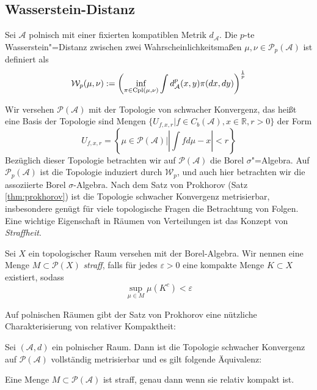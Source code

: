 \subsection{Wasserstein-Distanz}
\begin{definition}\label{def:wasserstein_distance}
    Sei $\mathcal{A}$ polnisch mit einer fixierten kompatiblen Metrik $d_\mathcal{A}$. Die $p$-te Wasserstein"=Distanz zwischen zwei Wahrscheinlichkeitsmaßen $\mu, \nu \in \mathcal{P}_p(\mathcal{A})$ ist definiert als
    $$\mathcal{W}_p(\mu, \nu) := \left( \inf_{\pi \in \operatorname{Cpl}(\mu, \nu)} \int d^p_\mathcal{A}(x, y) \pi(dx, dy) \right)^\frac{1}{p}$$
\end{definition}
Wir versehen $\mathcal{P}(\mathcal{A})$ mit der Topologie von schwacher Konvergenz, das heißt eine Basis der Topologie sind Mengen $\{U_{f, x, r} \vert f \in C_b(\mathcal{A}), x\in \mathbb{R}, r>0\}$ der Form 
$$U_{f, x, r} = \left\{ \mu \in \mathcal{P}(\mathcal{A}) \vert \left| \int f d\mu - x\right| < r\right\}$$
Bezüglich dieser Topologie betrachten wir auf $\mathcal{P}(\mathcal{A})$ die Borel $\sigma$"=Algebra. Auf $\mathcal{P}_p(\mathcal{A})$ ist die Topologie induziert durch $\mathcal{W}_p$, und auch hier betrachten wir die assoziierte Borel $\sigma$-Algebra. Nach dem Satz von Prokhorov (Satz \ref{thm:prokhorov}) ist die Topologie schwacher Konvergenz metrisierbar, insbesondere genügt für viele topologische Fragen die Betrachtung von Folgen. \\

Eine wichtige Eigenschaft in Räumen von Verteilungen ist das Konzept von \emph{Straffheit}. 
\begin{definition}
    Sei $X$ ein topologischer Raum versehen mit der Borel-Algebra. Wir nennen eine Menge $M\subset \mathcal{P}(X)$ \emph{straff}, falls für jedes $\varepsilon>0$ eine kompakte Menge $K\subset X$ existiert, sodass 
    $$\sup_{\mu \in M} \mu(K^c) < \varepsilon$$
\end{definition}
 Auf polnischen Räumen gibt der Satz von Prokhorov eine nützliche Charakterisierung von relativer Kompaktheit:

\begin{theorem}\label{thm:prokhorov}
Sei $(\mathcal{A}, d)$ ein polnischer Raum. Dann ist die Topologie schwacher Konvergenz auf $\mathcal{P}(\mathcal{A})$ vollständig metrisierbar und es gilt folgende Äquivalenz:

Eine Menge $M \subset \mathcal{P}(\mathcal{A})$ ist straff, genau dann wenn sie relativ kompakt ist.
\end{theorem}

